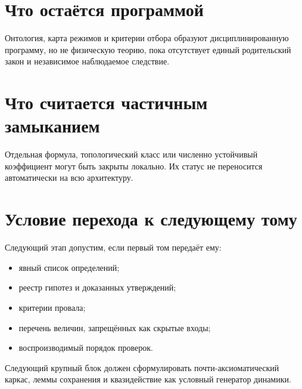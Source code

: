 \section{Что остаётся программой}

Онтология, карта режимов и критерии отбора образуют дисциплинированную
программу, но не физическую теорию, пока отсутствует единый родительский закон
и независимое наблюдаемое следствие.

\section{Что считается частичным замыканием}

Отдельная формула, топологический класс или численно устойчивый коэффициент
могут быть закрыты локально. Их статус не переносится автоматически на всю
архитектуру.

\section{Условие перехода к следующему тому}

Следующий этап допустим, если первый том передаёт ему:
\begin{itemize}
 \item явный список определений;
 \item реестр гипотез и доказанных утверждений;
 \item критерии провала;
 \item перечень величин, запрещённых как скрытые входы;
 \item воспроизводимый порядок проверок.
\end{itemize}

Следующий крупный блок должен сформулировать почти-аксиоматический каркас,
леммы сохранения и квазидействие как условный генератор динамики.